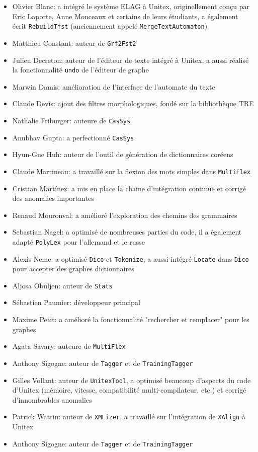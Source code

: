 \begin{itemize}                   
    \item Olivier Blanc: a intégré le système ELAG à Unitex, originellement conçu par Eric Laporte,
    Anne Monceaux et certains de leurs étudiants, a également écrit \verb+RebuildTfst+ (anciennement
     appelé \verb+MergeTextAutomaton+)
    \item Matthieu Constant: auteur de \verb+Grf2Fst2+
    \item Julien Decreton: auteur de l'éditeur de texte intégré à Unitex,
    	    a aussi réalisé la fonctionnalité \verb+undo+ de l'éditeur de graphe
    \item Marwin Damis: amélioration de l'interface de l'automate du texte
    \item Claude Devis: ajout des filtres morphologiques, fondé sur la bibliothèque TRE
    \item Nathalie Friburger: auteure de \verb+CasSys+
    \item Anubhav Gupta: a perfectionné \verb+CasSys+
    \item Hyun-Gue Huh: auteur de l'outil de génération de dictionnaires coréens
    \item Claude Martineau: a travaillé sur la flexion des mots simples dans \verb+MultiFlex+
    \item Cristian Martínez: a mis en place la chaine d'intégration continue et corrigé des anomalies
    importantes
    \item  Renaud Mouronval: a amélioré l'exploration des chemins des grammaires
    \item Sebastian Nagel: a optimisé de nombreuses parties du code, il a également adapté
    	    \verb+PolyLex+ pour l'allemand et le russe
    \item Alexis Neme: a optimisé \verb+Dico+ et \verb+Tokenize+, a aussi intégré \verb+Locate+
    dans \verb+Dico+ pour accepter des graphes dictionnaires
     \item Aljosa Obuljen: auteur de \verb+Stats+
     \item Sébastien Paumier: développeur principal
    \item Maxime Petit: a amélioré la fonctionnalité "rechercher et remplacer" pour les graphes
     \item Agata Savary: auteure de \verb+MultiFlex+
    \item Anthony Sigogne: auteur de \verb+Tagger+ et de \verb+TrainingTagger+
    \item Gilles Vollant: auteur de \verb+UnitexTool+, a optimisé beaucoup
    	    d'aspects du code d'Unitex (mémoire, vitesse, compatibilité multi-compilateur, etc.) et corrigé
    	    d'innombrables anomalies
    \item Patrick Watrin: auteur de \verb+XMLizer+, a travaillé sur l'intégration de \verb+XAlign+ à Unitex
    \item Anthony Sigogne: auteur de \verb+Tagger+ et de \verb+TrainingTagger+
\end{itemize}

